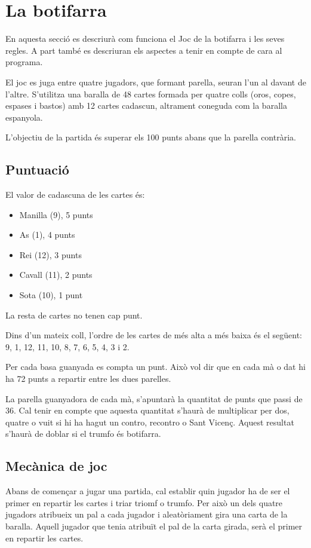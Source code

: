 \section{La botifarra}

En aquesta secció es descriurà com funciona el Joc de la botifarra i les seves regles. A part també es descriuran els aspectes a tenir en compte de cara al programa. 


El joc es juga entre quatre jugadors, que formant parella, seuran l'un al davant de l'altre. S'utilitza una baralla de 48 cartes formada per quatre colls (oros, copes, espases i bastos) amb 12 cartes cadascun, altrament coneguda com la baralla espanyola.


L'objectiu de la partida és superar els 100 punts abans que la parella contrària. 


\subsection{Puntuació}

El valor de cadascuna de les cartes és:
\begin{itemize}
	\item{Manilla (9), 5 punts}
    \item{As (1), 4 punts}
    \item{Rei (12), 3 punts}
    \item{Cavall (11), 2 punts}
    \item{Sota (10), 1 punt}
\end{itemize}

La resta de cartes no tenen cap punt.
    
Dins d'un mateix coll, l'ordre de les cartes de més alta a més baixa és el següent: 9, 1, 12, 11, 10, 8, 7, 6, 5, 4, 3 i 2.

Per cada basa guanyada es compta un punt. Això vol dir que en cada mà o dat hi ha 72 punts a repartir entre les dues parelles.

La parella guanyadora de cada mà, s'apuntarà la quantitat de punts que passi de 36. Cal tenir en compte que aquesta quantitat s'haurà de multiplicar per dos, quatre o vuit si hi ha hagut un contro, recontro o Sant Vicenç. Aquest resultat s'haurà de doblar si el trumfo és botifarra.

\subsection{Mecànica de joc}

Abans de començar a jugar una partida, cal establir quin jugador ha de ser el primer en repartir les cartes i triar triomf o trumfo. Per això un dels quatre jugadors atribueix un pal a cada jugador i aleatòriament gira una carta de la baralla. Aquell jugador que tenia atribuït el pal de la carta girada, serà el primer en repartir les cartes.



